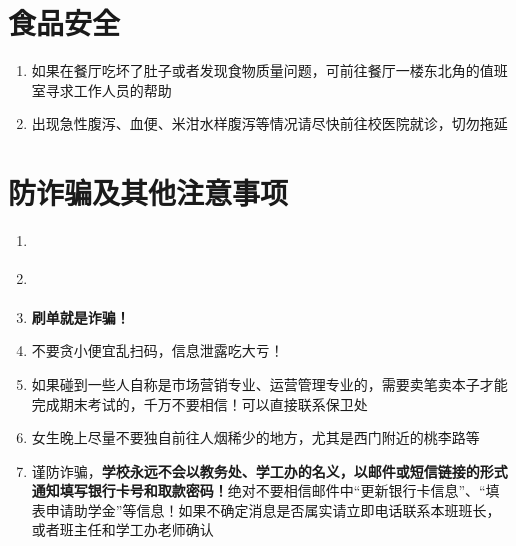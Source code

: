 \section[食品安全]{食品安全}
\begin{enumerate}
    \item 如果在餐厅吃坏了肚子或者发现食物质量问题，可前往餐厅一楼东北角的值班室寻求工作人员的帮助
    \item 出现急性腹泻、血便、米泔水样腹泻等情况请尽快前往校医院就诊，切勿拖延
\end{enumerate}

\section[防诈骗及其他注意事项]{防诈骗及其他注意事项}
\begin{enumerate}
    \item \textbf{}
    \item \textbf{}
    \item \textbf{刷单就是诈骗！}
    \item 不要贪小便宜乱扫码，信息泄露吃大亏！
    \item 如果碰到一些人自称是市场营销专业、运营管理专业的，需要卖笔卖本子\footnotemark 才能完成期末考试的，千万不要相信！可以直接联系保卫处
    \item 女生晚上尽量不要独自前往人烟稀少的地方，尤其是西门附近的桃李路等
    \item 谨防诈骗，\textbf{学校永远不会以教务处、学工办的名义，以邮件或短信链接的形式通知填写银行卡号和取款密码！}绝对不要相信邮件中“更新银行卡信息”、“填表申请助学金”等信息！如果不确定消息是否属实请立即电话联系本班班长，或者班主任和学工办老师确认
\end{enumerate}
